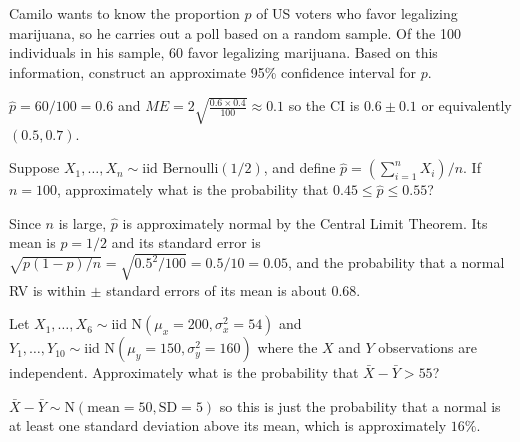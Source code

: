 \documentclass[addpoints,12pt]{exam}
\begin{document}
\begin{questions}

  \question Camilo wants to know the proportion $p$ of US voters who favor legalizing marijuana, so he carries out a poll based on a random sample.
  Of the 100 individuals in his sample, 60 favor legalizing marijuana.
  Based on this information, construct an approximate 95\% confidence interval for $p$.
  \begin{solution}
    $\widehat{p} = 60/100 = 0.6$ and $ME = 2\displaystyle\sqrt{\frac{0.6 \times 0.4}{100}}\approx 0.1$ so the CI is $0.6 \pm 0.1$ or equivalently $(0.5, 0.7)$.
  \end{solution}

  \question Suppose $X_1, \dots, X_n \sim \mbox{iid Bernoulli}(1/2)$, and define $\widehat{p} = (\sum_{i=1}^n X_i)/n$.
  If $n=100$, approximately what is the probability that $0.45 \leq \widehat{p} \leq 0.55$?
  \begin{solution}
    Since $n$ is large, $\widehat{p}$ is approximately normal by the Central Limit Theorem. 
    Its mean is $p = 1/2$ and its standard error is $\sqrt{p(1-p)/n} = \sqrt{0.5^2/100}= 0.5/10 = 0.05$, and the probability that a normal RV is within $\pm$ standard errors of its mean is about 0.68.
  \end{solution}


  \question Let $X_1, \dots, X_6 \sim \mbox{iid N}(\mu_x = 200, \sigma_x^2 = 54)$ and $Y_1, \dots, Y_{10} \sim \mbox{iid N}(\mu_y = 150, \sigma_y^2 = 160)$ where the $X$ and $Y$ observations are independent.
  Approximately what is the probability that $\bar{X} - \bar{Y} > 55$? 
  \begin{solution}
    $\bar{X} - \bar{Y} \sim \mbox{N}(\mbox{mean} = 50, \mbox{SD} = 5)$ so this is just the probability that a normal is at least one standard deviation above its mean, which is approximately $16\%$.
  \end{solution}


\end{questions}
\end{document}
